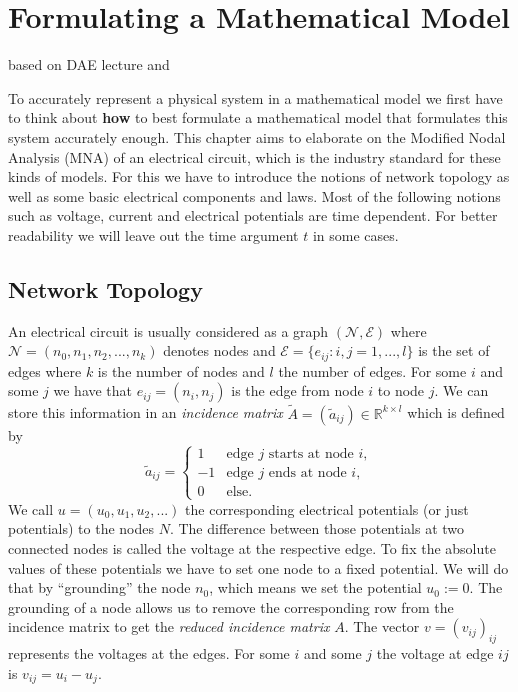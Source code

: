 \chapter{Formulating a Mathematical Model}
based on DAE lecture and \cite{ModellingAndDiscretizationOfCircuitProblems}

To accurately represent a physical system in a mathematical model we first have to think about \textbf{how} to best formulate a mathematical model that formulates this system accurately enough.
This chapter aims to elaborate on the Modified Nodal Analysis (MNA) of an electrical circuit, which is the industry standard for these kinds of models. For this we have to introduce the notions of network topology as well as some basic electrical components and laws. Most of the following notions such as voltage, current and electrical potentials are time dependent. For better readability we will leave out the time argument $t$ in some cases.

\section{Network Topology}
An electrical circuit is usually considered as a graph $(\mathcal{N},\mathcal{E})$ where $\mathcal{N} = (n_0, n_1, n_2, ..., n_k)$ denotes nodes and $\mathcal{E} = \{e_{ij}: i,j = 1,...,l\}$ is the set of edges where $k$ is the number of nodes and $l$ the number of edges. For some $i$ and some $j$ we have that $e_{ij} = (n_i, n_j)$ is the edge from node $i$ to node $j$.
We can store this information in an \emph{incidence matrix} $\tilde{A} = (\tilde{a}_{ij}) \in \mathbb{R}^{k \times l}$ which is defined by
\begin{displaymath}
	\tilde{a}_{ij} = 
	\begin{cases}
		1 &   \text{edge $j$ starts at node $i$},\\
		-1 &  \text{edge $j$  ends at node $i$},\\
		0 & \text{else}.				
	\end{cases}
\end{displaymath}
We call $u = (u_0, u_1, u_2, ...)$ the corresponding electrical potentials (or just potentials) to the nodes $N$. The difference between those potentials at two connected nodes is called the voltage at the respective edge. To fix the absolute values of these potentials we have to set one node to a fixed potential. We will do that by ``grounding'' the node $n_0$, which means we set the potential $u_0 := 0$. The grounding of a node allows us to remove the corresponding row from the incidence matrix to get the \emph{reduced incidence matrix} $A$. The vector $v = (v_{ij})_{ij}$ represents the voltages at the edges. For some $i$ and some $j$ the voltage at edge $ij$ is $v_{ij} = u_i - u_j$.

